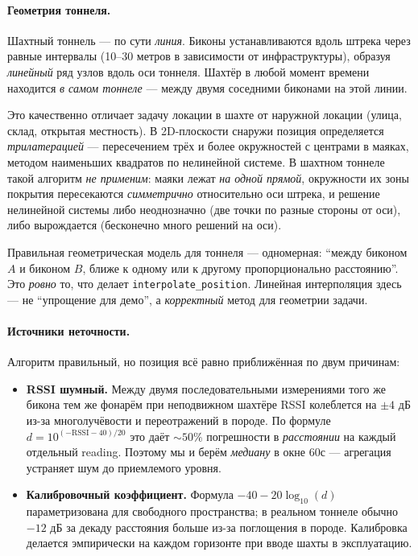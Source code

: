 \paragraph{Геометрия тоннеля.} Шахтный тоннель --- по сути
\emph{линия}. Биконы устанавливаются вдоль штрека через равные
интервалы (10--30 метров в зависимости от инфраструктуры), образуя
\emph{линейный} ряд узлов вдоль оси тоннеля. Шахтёр в любой момент
времени находится \emph{в самом тоннеле} --- между двумя соседними
биконами на этой линии.

Это качественно отличает задачу локации в шахте от наружной
локации (улица, склад, открытая местность). В 2D-плоскости снаружи
позиция определяется \emph{трилатерацией} --- пересечением трёх и
более окружностей с центрами в маяках, методом наименьших квадратов
по нелинейной системе. В шахтном тоннеле такой алгоритм \emph{не
применим}: маяки лежат \emph{на одной прямой}, окружности их зоны
покрытия пересекаются \emph{симметрично} относительно оси штрека,
и решение нелинейной системы либо неоднозначно (две точки по разные
стороны от оси), либо вырождается (бесконечно много решений на оси).

Правильная геометрическая модель для тоннеля --- одномерная:
``между биконом $A$ и биконом $B$, ближе к одному или к другому
пропорционально расстоянию''. Это \emph{ровно} то, что делает
\texttt{interpolate\_position}. Линейная интерполяция здесь --- не
``упрощение для демо'', а \emph{корректный} метод для геометрии
задачи.

\paragraph{Источники неточности.} Алгоритм правильный, но позиция
всё равно приближённая по двум причинам:

\begin{itemize}
\item \textbf{RSSI шумный.} Между двумя последовательными
измерениями того же бикона тем же фонарём при неподвижном шахтёре
RSSI колеблется на $\pm 4$ дБ из-за многолучёвости и переотражений
в породе. По формуле $d = 10^{(- \text{RSSI} - 40)/20}$ это даёт
$\sim 50\%$ погрешности в \emph{расстоянии} на каждый отдельный
reading. Поэтому мы и берём \emph{медиану} в окне 60с --- агрегация
устраняет шум до приемлемого уровня.

\item \textbf{Калибровочный коэффициент.} Формула $-40 - 20\log_{10}(d)$
параметризована для свободного пространства; в реальном тоннеле
обычно $-12$ дБ за декаду расстояния больше из-за поглощения в
породе. Калибровка делается эмпирически на каждом горизонте при
вводе шахты в эксплуатацию.
\end{itemize}


